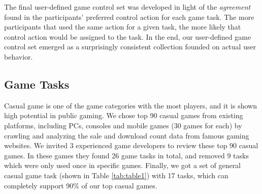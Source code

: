 \documentclass{sigchi}
\begin{document}
    The final user-defined game control set was developed in light of the \textsl{agreement} found in the participants' preferred control action for each game task\cite{Wobbrock:2005:MGS:1056808.1057043}. The more participants that used the same action for a given task, the more likely that control action would be assigned to the task. In the end, our user-defined game control set emerged as a surprisingly consistent collection founded on actual user behavior.


    \subsection {Game Tasks}

    Casual game is one of the game categories with the most players\cite{esa_ef_2014}, and it is shown high potential in public gaming\cite{Jurgelionis:2011:PET:2027456.2027462,Reis:2012:EMC:2405577.2405651,Biskupski:2014:DEB:2559206.2580097}. We chose top 90 casual games\cite{TopGames} from existing platforms, including PCs, consoles and mobile games (30 games for each) by crawling and analyzing the sale and download count data from famous gaming websites\cite{appannie,VGChartz,Steam,GameStop}. We invited 3 experienced game developers to review these top 90 casual games. In these games they found 26 game tasks in total, and removed 9 tasks which were only used once in specific games. Finally, we got a set of general casual game task (shown in Table \ref{tab:table1}) with 17 tasks, which can completely support 90\% of our top casual games. 
\end{document}
